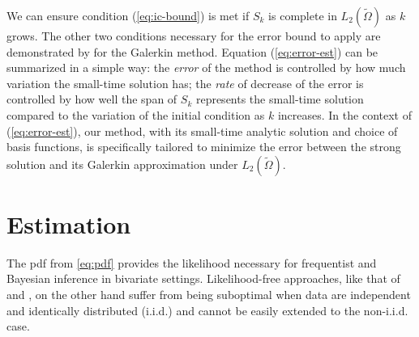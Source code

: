 We can ensure condition (\ref{eq:ic-bound}) is met if $S_k$ is
complete in $L_2(\tilde{\Omega})$ as $k$ grows. The other two conditions
necessary for the error bound to apply are demonstrated by
\cite{bramble1977some} for the Galerkin method. Equation
(\ref{eq:error-est}) can be summarized in a simple way: the
\textit{error} of the method is controlled by how much variation the
small-time solution has; the \textit{rate} of decrease of the error is
controlled by how well the span of $S_k$ represents the small-time
solution compared to the variation of the initial condition as $k$
increases. In the context of (\ref{eq:error-est}), our method, with
its small-time analytic solution and choice of basis functions, is
specifically tailored to minimize the error between the strong
solution and its Galerkin approximation under $L_2(\tilde{\Omega})$.



\section{Estimation}
The pdf from \eqref{eq:pdf} provides the likelihood
necessary for frequentist and Bayesian inference in bivariate
settings.  Likelihood-free approaches, like that of
\cite{rogers1991estimating} and \cite{rogers2008estimating}, on the other
hand suffer from being suboptimal when data are independent and
identically distributed (i.i.d.) and cannot be easily extended to the
non-i.i.d. case.

